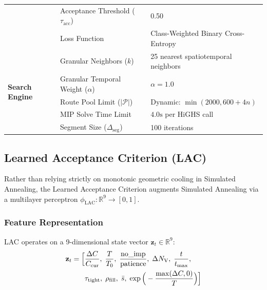 \begin{table}[!t]
\begin{tabularx}{\columnwidth}{l l X}
  & Acceptance Threshold ($\tau_{\text{acc}}$) & 0.50 \\
  & Loss Function & Class-Weighted Binary Cross-Entropy \\
\midrule
\multirow{5}{*}{\textbf{Search Engine}} 
  & Granular Neighbors ($k$) & 25 nearest spatiotemporal neighbors \\
  & Granular Temporal Weight ($\alpha$) & $\alpha = 1.0$ \\
  & Route Pool Limit ($|\mathcal{P}|$) & Dynamic: $\min(2000, 600 + 4n)$ \\
  & MIP Solve Time Limit & $4.0\text{s}$ per HiGHS call \\
  & Segment Size ($\Delta_{\text{seg}}$) & 100 iterations \\
\bottomrule
\end{tabularx}
\end{table}

\subsection{Learned Acceptance Criterion (LAC)}
\label{sec:lac_formulation}

Rather than relying strictly on monotonic geometric cooling in Simulated Annealing, the Learned Acceptance Criterion augments Simulated Annealing via a multilayer perceptron $\phi_{\text{LAC}}: \mathbb{R}^9 \to [0, 1]$.

\subsubsection{Feature Representation}
LAC operates on a 9-dimensional state vector $\mathbf{z}_t \in \mathbb{R}^9$:
\begin{align}
  \mathbf{z}_t = \Big[ 
    &\frac{\Delta C}{C_{\text{cur}}}, \; \frac{T}{T_0}, \; \frac{\text{no\_imp}}{\text{patience}}, \; \Delta {N_\mathrm{V}}, \; \frac{t}{t_{\max}}, \nonumber \\
    &\tau_{\text{tight}}, \; \rho_{\text{fill}}, \; \bar{s}, \; \exp\Big(-\frac{\max(\Delta C, 0)}{T}\Big)
  \Big]
  \label{eq:lac_features}
\end{align}

